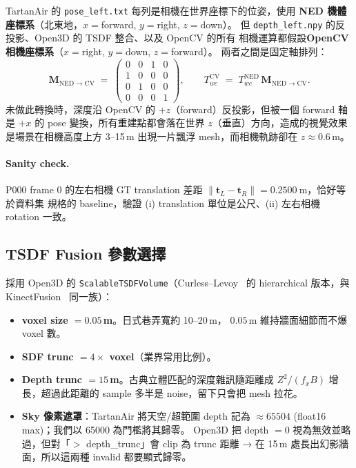 \documentclass[12pt]{article}
\begin{document}
TartanAir 的 \texttt{pose\_left.txt} 每列是相機在世界座標下的位姿，使用
\textbf{NED 機體座標系}（北東地，$x{=}$forward, $y{=}$right, $z{=}$down）。
但 \texttt{depth\_left.npy} 的反投影、Open3D 的 TSDF 整合、以及 OpenCV 的所有
相機運算都假設\textbf{OpenCV 相機座標系}（$x{=}$right, $y{=}$down, $z{=}$forward）。
兩者之間是固定軸排列：
\begin{equation}
  \mathbf{M}_{\mathrm{NED}\to\mathrm{CV}} \;=\;
  \begin{pmatrix}
    0 & 0 & 1 & 0 \\
    1 & 0 & 0 & 0 \\
    0 & 1 & 0 & 0 \\
    0 & 0 & 0 & 1
  \end{pmatrix},
  \qquad
  T^{\mathrm{CV}}_{\!wc} \;=\; T^{\mathrm{NED}}_{\!wc}\,\mathbf{M}_{\mathrm{NED}\to\mathrm{CV}}.
  \label{eq:ned2cv}
\end{equation}
未做此轉換時，深度沿 OpenCV 的 $+z$（forward）反投影，但被一個 forward 軸是
$+x$ 的 pose 變換，所有重建點都會落在世界 $z$（垂直）方向，造成的視覺效果
是場景在相機高度上方 3--15\,m 出現一片飄浮 mesh，而相機軌跡卻在 $z\approx0.6\,\mathrm{m}$。

\paragraph{Sanity check.} P000 frame 0 的左右相機 GT translation 差距
$\lVert \mathbf{t}_L - \mathbf{t}_R \rVert = \SI{0.2500}{\meter}$，恰好等於資料集
規格的 baseline，驗證 (i) translation 單位是公尺、(ii) 左右相機 rotation 一致。

\subsection{TSDF Fusion 參數選擇}
\label{sec:bonus-tsdf}
採用 Open3D 的 \texttt{ScalableTSDFVolume}（Curless--Levoy~\cite{Curless1996}
的 hierarchical 版本，與 KinectFusion~\cite{Newcombe2011} 同一族）：

\begin{itemize}
\item \textbf{voxel size $=0.05$\,m}。日式巷弄寬約 10--20\,m，
$0.05$\,m 維持牆面細節而不爆 voxel 數。
\item \textbf{SDF trunc $=4\times$ voxel}（業界常用比例）。
\item \textbf{Depth trunc $=15$\,m}。古典立體匹配的深度雜訊隨距離成
$Z^2/(f_x B)$ 增長，超過此距離的 sample 多半是 noise，留下只會把 mesh 拉花。
\item \textbf{Sky 像素遮罩}：TartanAir 將天空/超範圍 depth 記為
$\approx65504$ (float16 max)；我們以 65000 為門檻將其歸零。
Open3D 把 depth $=0$ 視為無效並略過，但對「$>$ depth\_trunc」會 clip 為
trunc 距離 → 在 15\,m 處長出幻影牆面，所以這兩種 invalid 都要顯式歸零。
\end{itemize}
\end{document}
